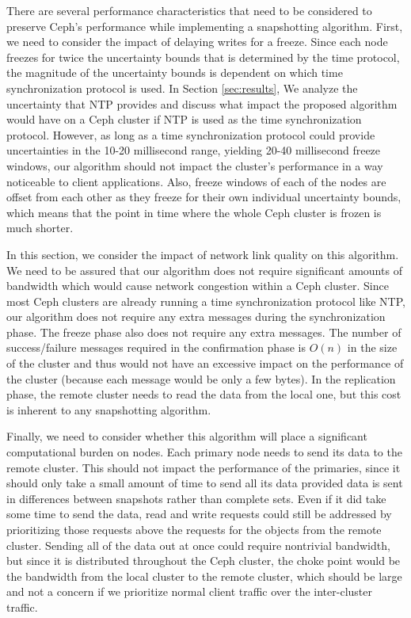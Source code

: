 There are several performance characteristics that need to be
considered to preserve Ceph's performance while implementing a
snapshotting algorithm. First, we need to consider the impact of
delaying writes for a freeze. Since each node freezes for twice the
uncertainty bounds that is determined by the time protocol, the
magnitude of the uncertainty bounds is dependent on which time
synchronization protocol is used. In Section \ref{sec:results}, We
analyze the uncertainty that NTP provides and discuss what impact the
proposed algorithm would have on a Ceph cluster if NTP is used as the
time synchronization protocol. However, as long as a time
synchronization protocol could provide uncertainties in the 10-20
millisecond range, yielding 20-40 millisecond
freeze %
windows, our algorithm should not impact the cluster's performance in
a way noticeable to client applications.  Also, freeze windows of each
of the nodes are offset from each other as they freeze for their own
individual uncertainty bounds, which means that the point in time
where the whole Ceph cluster is frozen is much shorter.

In this section, we consider the impact of network link quality on
this algorithm. We need to be assured that our algorithm does not
require significant amounts of bandwidth which would cause network
congestion within a Ceph cluster. Since most Ceph clusters are already
running a time synchronization protocol like NTP, our algorithm does
not require any extra messages during the synchronization phase. The
freeze phase also does not require any extra messages. The number of
success/failure messages required in the confirmation phase is $O(n)$
in the size of the cluster and thus would not have an excessive impact
on the performance of the cluster (because each message would be only
a few bytes). In the replication phase, the remote cluster needs to
read the data from the local one, but this cost is inherent to any
snapshotting algorithm.

Finally, we need to consider whether this algorithm will place a
significant computational burden on nodes. Each primary node needs to
send its data to the remote cluster. This should not impact the
performance of the primaries, since it should only take a small amount
of time to send all its data provided data is sent in differences
between snapshots rather than complete sets. Even if it did take some
time to send the data, read and write requests could still be
addressed by prioritizing those requests above the requests for the
objects from the remote cluster. Sending all of the data out at once
could require nontrivial bandwidth, but since it is distributed
throughout the Ceph cluster, the choke point would be the bandwidth
from the local cluster to the remote cluster, which should be large
and not a concern if we prioritize normal client traffic over the
inter-cluster traffic.

